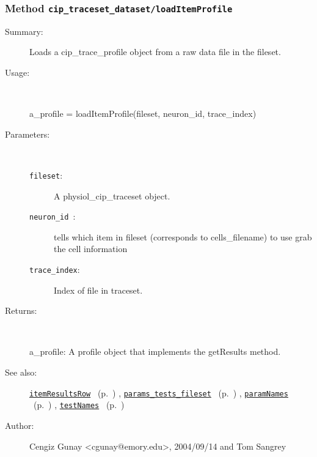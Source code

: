 \subsubsection[Method \texttt{loadItemProfile}]{Method \texttt{cip\_traceset\_dataset/loadItemProfile}}%
%
\label{ref_cip_traceset_dataset__loadItemProfile}%
\hypertarget{ref_cip_traceset_dataset__loadItemProfile}{}%
\begin{description}
\item[Summary:]Loads a cip\_trace\_profile object from a raw data file in the fileset.
%
\item[Usage:]~%
\begin{lyxcode}%
a\_profile = loadItemProfile(fileset, neuron\_id, trace\_index)
%
\end{lyxcode}%
%
%
\item[Parameters:]~
\begin{description}%
\item[\texttt{fileset}:]
     A physiol\_cip\_traceset object.
\item[\texttt{neuron\_id }:]
  tells which item in fileset (corresponds to cells\_filename) to use grab the cell information 
\item[\texttt{trace\_index}:]
 Index of file in traceset.
\end{description}%
%
\item[Returns:]~

	a\_profile: A profile object that implements the getResults method.
%
%
\item[See also:]%
\hyperlink{ref_itemResultsRow}{\texttt{itemResultsRow}}%
\ (p.~\pageref{ref_itemResultsRow})%
%
, \hyperlink{ref_params_tests_fileset}{\texttt{params\_tests\_fileset}}%
\ (p.~\pageref{ref_params_tests_fileset})%
%
, \hyperlink{ref_paramNames}{\texttt{paramNames}}%
\ (p.~\pageref{ref_paramNames})%
%
, \hyperlink{ref_testNames}{\texttt{testNames}}%
\ (p.~\pageref{ref_testNames})%
%
%
\item[Author:]%
Cengiz Gunay <cgunay@emory.edu>, 2004/09/14 and Tom Sangrey%
\end{description}
\methodline%
